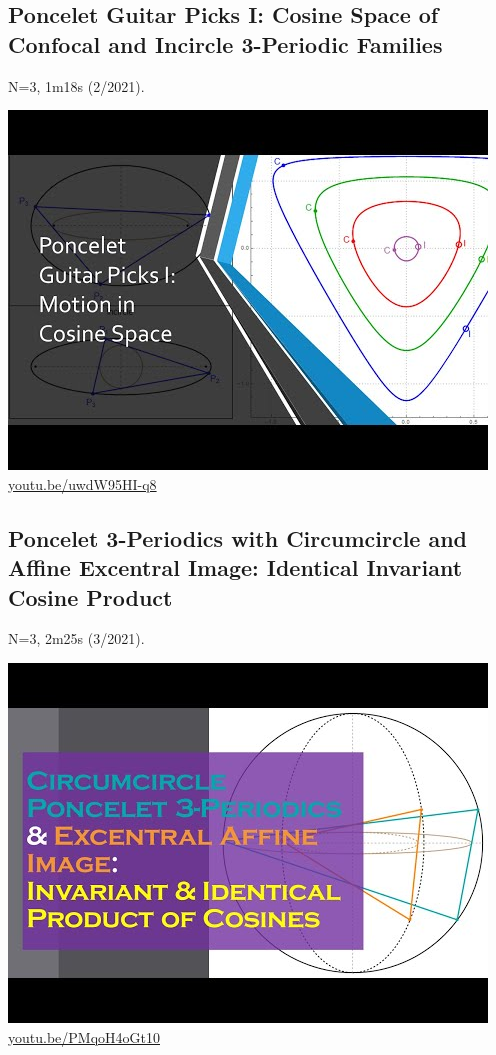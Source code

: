 \documentclass[12pt]{amsart}
\begin{document}
\subsection{Poncelet Guitar Picks I: Cosine Space of Confocal and Incircle 3-Periodic Families}
\label{vid:uwdW95HI-q8}
\noindent N=3, 1m18s (2/2021). 
\begin{center}\includegraphics[width=.5\textwidth]{pics/uwdW95HI-q8.jpg} \\ 
\href{https://youtu.be/uwdW95HI-q8}{\url{youtu.be/uwdW95HI-q8}}\end{center}
% 

\subsection{Poncelet 3-Periodics with Circumcircle and Affine Excentral Image: Identical Invariant Cosine Product}
\label{vid:PMqoH4oGt10}
\noindent N=3, 2m25s (3/2021). 
\begin{center}\includegraphics[width=.5\textwidth]{pics/PMqoH4oGt10.jpg} \\ 
\href{https://youtu.be/PMqoH4oGt10}{\url{youtu.be/PMqoH4oGt10}}\end{center}
% 
\end{document}
